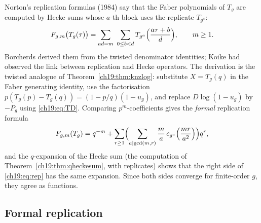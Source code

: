 Norton's replication formulas (1984) say that the Faber polynomials of $T_g$ are computed by Hecke sums whose $a$-th
block uses the replicate $T_{g^a}$:
\begin{equation}\label{ch19:eq:rep}
  F_{g,m}\bigl(T_g(\tau)\bigr)=\sum_{ad=m}\ \sum_{0\le b<d}T_{g^a}\Bigl(\frac{a\tau+b}d\Bigr),\qquad m\ge1 .
\end{equation}
Borcherds derived them from the twisted denominator identities; Koike had observed the link between replication and
Hecke operators.  The derivation is the twisted analogue of Theorem~\ref{ch19:thm:knzlog}: substitute $X=T_g(q)$ in the
Faber generating identity, use the factorisation $p(T_g(p)-T_g(q))=(1-p/q)(1-u_g)$, and replace $D\log(1-u_g)$ by $-P_g$
using \eqref{ch19:eq:TD}.  Comparing $p^m$-coefficients gives the \emph{formal} replication formula
\begin{equation}\label{ch19:eq:repformal}
  F_{g,m}(T_g)=q^{-m}+\sum_{r\ge1}\Bigl(\sum_{a\mid\gcd(m,r)}\frac ma\,c_{g^a}\Bigl(\frac{mr}{a^2}\Bigr)\Bigr)q^r ,
\end{equation}
and the $q$-expansion of the Hecke sum (the computation of Theorem~\ref{ch19:thm:qheckesum}, with replicates) shows that the
right side of \eqref{ch19:eq:rep} has the same expansion.  Since both sides converge for finite-order $g$, they agree as
functions.

\subsection{Formal replication}

